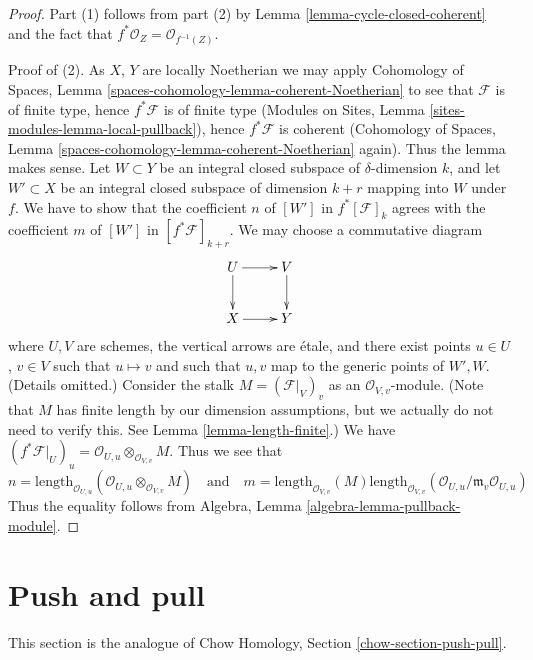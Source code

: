 \documentclass{stacks-project}
\theoremstyle{plain}
\theoremstyle{definition}
\theoremstyle{remark}
\numberwithin{equation}{subsection}
\begin{document}
\begin{proof}
Part (1) follows from part (2) by Lemma \ref{lemma-cycle-closed-coherent}
and the fact that $f^*\mathcal{O}_Z = \mathcal{O}_{f^{-1}(Z)}$.

\medskip\noindent
Proof of (2).
As $X$, $Y$ are locally Noetherian we may apply
Cohomology of Spaces, Lemma \ref{spaces-cohomology-lemma-coherent-Noetherian}
to see
that $\mathcal{F}$ is of finite type, hence $f^*\mathcal{F}$ is
of finite type (Modules on Sites, Lemma
\ref{sites-modules-lemma-local-pullback}),
hence $f^*\mathcal{F}$ is coherent
(Cohomology of Spaces, Lemma \ref{spaces-cohomology-lemma-coherent-Noetherian}
again).
Thus the lemma makes sense. Let $W \subset Y$ be an integral closed
subspace of $\delta$-dimension $k$, and let $W' \subset X$ be
an integral closed subspace of dimension $k + r$ mapping into $W$
under $f$. We have to show that the coefficient $n$ of
$[W']$ in $f^*[{\mathcal F}]_k$ agrees with the coefficient
$m$ of $[W']$ in $[f^*{\mathcal F}]_{k+r}$. We may choose
a commutative diagram
$$
\xymatrix{
U \ar[d] \ar[r] & V \ar[d] \\
X \ar[r] & Y
}
$$
where $U, V$ are schemes, the vertical arrows are \'etale, and
there exist points $u \in U$, $v \in V$ such that
$u \mapsto v$ and such that $u, v$ map to the generic
points of $W', W$. (Details omitted.)
Consider the stalk $M = (\mathcal{F}|_V)_v$ as an $\mathcal{O}_{V, v}$-module.
(Note that $M$ has finite length by our dimension assumptions, but we
actually do not need to verify this. See Lemma \ref{lemma-length-finite}.)
We have
$(f^*\mathcal{F}|_U)_u = \mathcal{O}_{U, u} \otimes_{\mathcal{O}_{V, v}} M$.
Thus we see that
$$
n = \text{length}_{\mathcal{O}_{U, u}}
(\mathcal{O}_{U, u} \otimes_{\mathcal{O}_{V, v}} M)
\quad
\text{and}
\quad
m = \text{length}_{\mathcal{O}_{V, v}}(M)
\text{length}_{\mathcal{O}_{V, v}}(
\mathcal{O}_{U, u}/\mathfrak m_v \mathcal{O}_{U, u})
$$
Thus the equality follows from
Algebra, Lemma \ref{algebra-lemma-pullback-module}.
\end{proof}









\section{Push and pull}
\label{section-push-pull}

\noindent
This section is the analogue of
Chow Homology, Section \ref{chow-section-push-pull}.
\end{document}
